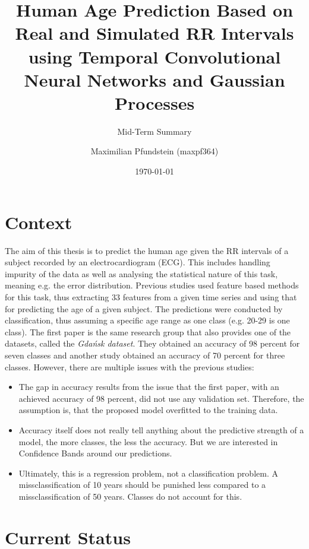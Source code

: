 \documentclass[11pt]{scrartcl}
\title{Human Age Prediction Based on Real and Simulated RR Intervals using Temporal Convolutional Neural Networks and Gaussian Processes}
\subtitle{Mid-Term Summary}
\author{Maximilian Pfundstein (maxpf364)}
\date{\today}
\begin{document}
\maketitle

\newpage

\section{Context}

The aim of this thesis is to predict the human age given the RR intervals of a subject recorded by an electrocardiogram (ECG). This includes handling impurity of the data as well as analysing the statistical nature of this task, meaning e.g. the error distribution. Previous studies used feature based methods for this task, thus extracting 33 features from a given time series and using that for predicting the age of a given subject. The predictions were conducted by classification, thus assuming a specific age range as one class (e.g. 20-29 is one class). The first paper is the same research group that also provides one of the datasets, called the \textit{Gdańsk dataset}. They obtained an accuracy of 98 percent for seven classes and another study obtained an accuracy of 70 percent for three classes. However, there are multiple issues with the previous studies:

\begin{itemize}
    \item The gap in accuracy results from the issue that the first paper, with an achieved accuracy of 98 percent, did not use any validation set. Therefore, the assumption is, that the proposed model overfitted to the training data.
    \item Accuracy itself does not really tell anything about the predictive strength of a model, the more classes, the less the accuracy. But we are interested in Confidence Bands around our predictions.
    \item Ultimately, this is a regression problem, not a classification problem. A missclassification of 10 years should be punished less compared to a missclassification of 50 years. Classes do not account for this.
\end{itemize}

\section{Current Status}
\end{document}

